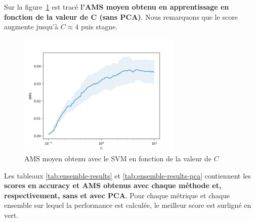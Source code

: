 \documentclass[12pt]{article}
\newcommand{\figref}[1]{figure~\ref{#1}}
\begin{document}

Sur la \figref{img:ams-C} est tracé \textbf{l'AMS moyen obtenu en apprentissage
en fonction de la valeur de $\bm{C}$ (sans PCA)}. Nous remarquons que le score
augmente jusqu'à $C \approx 4$ puis stagne.

\begin{figure}[H]
    \center
    \includegraphics[width=0.7\textwidth]{images/ams.png}
    \caption{AMS moyen obtenu avec le SVM en fonction de la valeur de $C$}
    \label{img:ams-C}
\end{figure}

Les tableaux \ref{tab:ensemble-results} et \ref{tab:ensemble-results-pca}
contiennent les \textbf{scores en accuracy et AMS obtenus avec chaque méthode
et, respectivement, sans et avec PCA}. Pour chaque métrique et chaque ensemble
sur lequel la performance est calculée, le meilleur score est surligné en vert.
\end{document}
